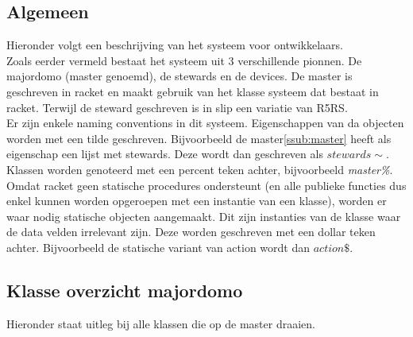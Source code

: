 \documentclass{article}
\begin{document}
\subsection{Algemeen}
\label{sub:intro}
Hieronder volgt een beschrijving van het systeem voor ontwikkelaars. \\
Zoals eerder vermeld bestaat het systeem uit 3 verschillende pionnen. De majordomo (master genoemd), de stewards en de devices. De master is geschreven in racket en maakt gebruik van het klasse systeem dat bestaat in racket. Terwijl de steward geschreven is in slip een variatie van R5RS.\\
Er zijn enkele naming conventions in dit systeem. Eigenschappen van da objecten worden met een tilde geschreven. Bijvoorbeeld de master\ref{ssub:master} heeft als eigenschap een lijst met stewards. Deze wordt dan geschreven als $stewards\sim$.\\
Klassen worden genoteerd met een percent teken achter, bijvoorbeeld \emph{master\%}.\\
Omdat racket geen statische procedures ondersteunt (en alle publieke functies dus enkel kunnen worden opgeroepen met een instantie van een klasse), worden er waar nodig statische objecten aangemaakt. Dit zijn instanties van de klasse waar de data velden irrelevant zijn. Deze worden geschreven met een dollar teken achter. Bijvoorbeeld de statische variant van action wordt dan $action\$$.\\

\subsection{Klasse overzicht majordomo}
\label{sub:class}
Hieronder staat uitleg bij alle klassen die op de master draaien.
\end{document}
